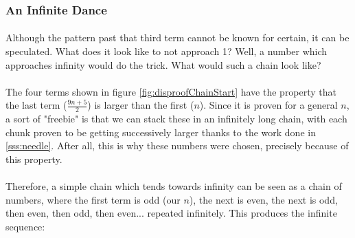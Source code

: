 \documentclass[12pt,letterpaper]{article}
\begin{document}
		\newpage %
		
		\subsubsection{An Infinite Dance} \label{sss:infinite}
		
			\paragraph{} Although the pattern past that third term cannot be known for certain, it can be speculated. What does it look like to not approach 1? Well, a number which approaches infinity would do the trick. What would such a chain look like?
			
			\paragraph{} The four terms shown in figure \ref{fig:disproofChainStart} have the property that the last term ($\frac{9n+5}{2}$) is larger than the first ($n$). Since it is proven for a general $n$, a sort of "freebie" is that we can stack these in an infinitely long chain, with each chunk proven to be getting successively larger thanks to the work done in \ref{sss:needle}. After all, this is why these numbers were chosen, precisely because of this property.
			
			\paragraph{} Therefore, a simple chain which tends towards infinity can be seen as a chain of numbers, where the first term is odd (our $n$), the next is even, the next is odd, then even, then odd, then even... repeated infinitely. This produces the infinite sequence:
			
\end{document}
